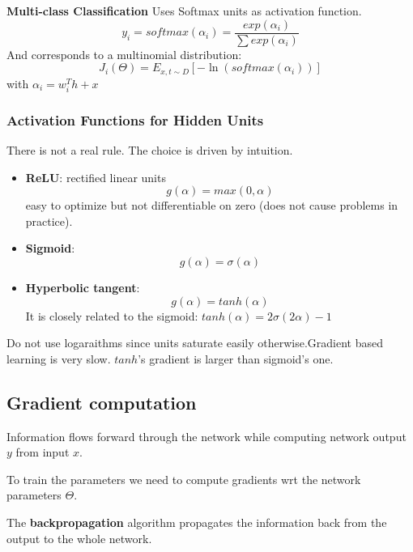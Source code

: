 \textbf{Multi-class Classification}
Uses Softmax units as activation function.
\begin{equation}
    y_{i} = softmax(\alpha_{i}) = \frac{exp(\alpha_{i})}{\sum exp (\alpha_{i})}
\end{equation}
And corresponds to a multinomial distribution:
\begin{equation}
    J_{i}(\Theta) = E_{x, t \sim D} \left[-\ln (softmax(\alpha_{i}))\right]
\end{equation}
with $\alpha_{i} = w^{T}_{i}h + x$

\subsubsection{Activation Functions for Hidden Units}
There is not a real rule. The choice is driven by intuition.
\begin{itemize}
    \item \textbf{ReLU}: rectified linear units
    \begin{equation}
        g(\alpha) = max(0, \alpha)
    \end{equation}
    easy to optimize but not differentiable on zero (does not cause problems in practice).
    \item \textbf{Sigmoid}: \begin{equation}
        g(\alpha) = \sigma(\alpha)
    \end{equation}
    \item \textbf{Hyperbolic tangent}:
    \begin{equation}
        g(\alpha) = tanh(\alpha)
    \end{equation}
    It is closely related to the sigmoid: $tanh(\alpha) = 2\sigma(2\alpha) - 1$
\end{itemize}
Do not use logaraithms since units saturate easily otherwise.Gradient based learning is very slow. $tanh$'s gradient is larger than sigmoid's one.


\subsection{Gradient computation}
Information flows forward through the network while computing network output $y$ from input $x$.

To train the parameters we need to compute gradients wrt the network parameters $\Theta$.

The \textbf{backpropagation} algorithm propagates the information back from the output to the whole network.

